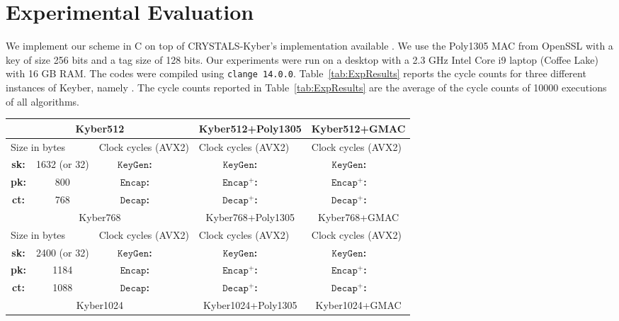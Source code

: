 \documentclass[floatrow,journal=tches,submission]{iacrtrans}
\newcommand{\keygen}{\texttt{KeyGen}}
\newcommand{\encap}{\texttt{Encap}}
\newcommand{\decap}{\texttt{Decap}}
\begin{document}
\section{Experimental Evaluation}
We implement our scheme in C on top of {\sf CRYSTALS-Kyber}'s implementation available \cite{}. We use the Poly1305 MAC from {\sf OpenSSL} with a key of size 256 bits and a tag size of 128 bits. Our experiments were run on a desktop with a 2.3 GHz Intel Core i9 laptop (Coffee Lake) with 16 GB RAM. The codes were compiled using \texttt{clange 14.0.0}. 
Table~\ref{tab:ExpResults} reports the cycle counts for three different instances of Keyber, namely . The cycle counts reported in Table~\ref{tab:ExpResults} are the average of the cycle counts of 10000 executions of all algorithms. 
\begin{table}[h]
\centering
\begin{tabular}{|c|c||c|c| |c|c| |c|c|} \hline
\multicolumn{4}{|c|}{Kyber512}  & \multicolumn{2}{|c|}{Kyber512+Poly1305} & \multicolumn{2}{|c|}{Kyber512+GMAC} \\ \hline
\multicolumn{2}{|l|}{Size in bytes} & \multicolumn{2}{|l|}{Clock cycles (AVX2)} & \multicolumn{2}{|l|}{Clock cycles (AVX2)} & \multicolumn{2}{|l|}{Clock cycles (AVX2)} \\ \hline 
{\bf sk:} & 1632 (or 32) & {\bf $\keygen$:} &  & {\bf $\keygen$:} & & {\bf $\keygen$:} & \\ \hline 
{\bf pk:} & 800 & {\bf $\encap$:} & & {\bf $\encap^+$:} & & {\bf $\encap^+$:} & \\ \hline 
{\bf ct:} & 768 & {\bf $\decap$:} &  & {\bf $\decap^+$:} & & {\bf $\decap^+$:} & \\ \hline 
\hline 
\multicolumn{4}{|c|}{Kyber768}  & \multicolumn{2}{|c|}{Kyber768+Poly1305} & \multicolumn{2}{|c|}{Kyber768+GMAC} \\ \hline
\multicolumn{2}{|l|}{Size in bytes} & \multicolumn{2}{|l|}{Clock cycles (AVX2)} & \multicolumn{2}{|l|}{Clock cycles (AVX2)} & \multicolumn{2}{|l|}{Clock cycles (AVX2)} \\ \hline 
{\bf sk:} & 2400 (or 32) & {\bf $\keygen$:} & & {\bf $\keygen$:} & & {\bf $\keygen$:} & \\ \hline 
{\bf pk:} & 1184 & {\bf $\encap$:} & & {\bf $\encap^+$:} &  & {\bf $\encap^+$:} & \\ \hline 
{\bf ct:} & 1088 & {\bf $\decap$:} &  & {\bf $\decap^+$:} & & {\bf $\decap^+$:} & \\ \hline 
\hline 
\multicolumn{4}{|c|}{Kyber1024}  & \multicolumn{2}{|c|}{Kyber1024+Poly1305} & \multicolumn{2}{|c|}{Kyber1024+GMAC} \\ \hline

\end{tabular}
\end{table}
\end{document}
